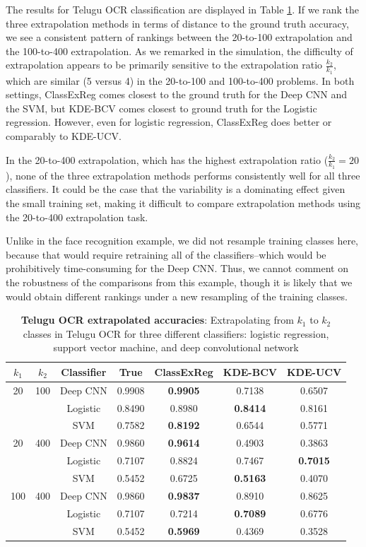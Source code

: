 \documentclass[twoside,11pt]{article}
\begin{document}
The results for Telugu OCR classification are displayed in Table \ref{tab:tel_accuracy}.  If we rank the three extrapolation methods in terms of distance to the ground truth accuracy, we see a consistent pattern of rankings between the 20-to-100 extrapolation and the 100-to-400 extrapolation.  As we remarked in the simulation, the difficulty of extrapolation appears to be primarily sensitive to the extrapolation ratio $\frac{k_2}{k_1}$, which are similar (5 versus 4) in the 20-to-100 and 100-to-400 problems.  In both settings, ClassExReg comes closest to the ground truth for the Deep CNN and the SVM, but KDE-BCV comes closest to ground truth for the Logistic regression.  However, even for logistic regression, ClassExReg does better or comparably to KDE-UCV.


In the 20-to-400 extrapolation, which has the highest extrapolation ratio ($\frac{k_2}{k_1} = 20$), none of the three extrapolation methods performs consistently well for all three classifiers.  It could be the case that the variability is a dominating effect given the small training set, making it difficult to compare extrapolation methods using the 20-to-400 extrapolation task.

Unlike in the face recognition example, we did not resample training classes here, because that would require retraining all of the classifiers--which would be prohibitively time-consuming for the Deep CNN.  Thus, we cannot comment on the robustness of the comparisons from this example, though it is likely that we would obtain different rankings under a new resampling of the training classes.

\begin{table}[t]
\centering
\begin{tabular}{c|c||c|c||c|c|c}
$k_1$ & $k_2$ & Classifier & True & ClassExReg & KDE-BCV & KDE-UCV \\ \hline
 20 & 100 & Deep CNN & 0.9908 & \textbf{0.9905} & 0.7138 & 0.6507 \\
    &     & Logistic & 0.8490 & 0.8980 & \textbf{0.8414} & 0.8161 \\
    &     & SVM      & 0.7582 & \textbf{0.8192} & 0.6544 & 0.5771 \\ \hline
 20 & 400 & Deep CNN & 0.9860 & \textbf{0.9614} & 0.4903 & 0.3863 \\
    &     & Logistic & 0.7107 & 0.8824 & 0.7467 & \textbf{0.7015} \\
    &     & SVM      & 0.5452 & 0.6725 & \textbf{0.5163} & 0.4070 \\ \hline
100 & 400 & Deep CNN & 0.9860 & \textbf{0.9837}& 0.8910 & 0.8625  \\
    &     & Logistic & 0.7107 & 0.7214& \textbf{0.7089} & 0.6776  \\
    &     & SVM      & 0.5452 & \textbf{0.5969}& 0.4369 & 0.3528  \\
\hline
\end{tabular}
\caption{\textbf{Telugu OCR extrapolated accuracies}: Extrapolating from $k_1$ to $k_2$ classes in Telugu OCR for three different classifiers: logistic regression, support vector machine, and deep convolutional network}\label{tab:tel_accuracy}
\end{table}
\end{document}
